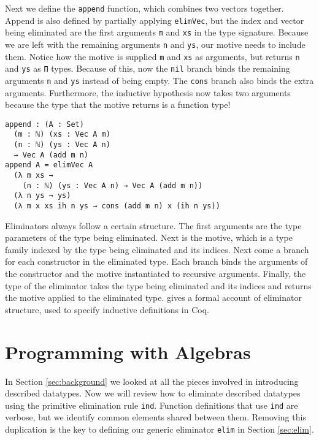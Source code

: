 \documentclass[preprint,nonatbib]{sigplanconf}
\begin{document}
Next we define the {\tt append} function, which combines two vectors
together. Append is also defined by partially applying
{\tt elimVec}, but the index and vector being eliminated are
the first arguments {\tt m} and {\tt xs} in the type signature.
Because we are left with the remaining arguments {\tt n} and 
{\tt ys}, our motive needs to include them. Notice how the motive is
supplied {\tt m} and {\tt xs} as arguments, but returns {\tt n} and
{\tt ys} as {\tt Π} types. Because of this, now the {\tt nil} branch
binds the remaining arguments {\tt n} and {\tt ys} instead of being
empty. The {\tt cons} branch also binds the extra arguments.
Furthermore, the inductive hypothesis now takes two arguments because
the type that the motive returns is a function type!

\begin{verbatim}
append : (A : Set)
  (m : ℕ) (xs : Vec A m)
  (n : ℕ) (ys : Vec A n)
  → Vec A (add m n)
append A = elimVec A
  (λ m xs →
    (n : ℕ) (ys : Vec A n) → Vec A (add m n))
  (λ n ys → ys)
  (λ m x xs ih n ys → cons (add m n) x (ih n ys))
\end{verbatim}

Eliminators always follow a certain structure. The first arguments are
the type parameters of the type being eliminated. Next is the motive,
which is a type family indexed by the type being eliminated and its
indices. Next come a branch for each constructor in the eliminated
type. Each branch binds the arguments of the constructor and the
motive instantiated to recursive arguments. Finally, the type of the
eliminator takes the type being eliminated and its indices and returns
the motive applied to the eliminated type. \citet{paulin1993inductive}
gives a formal account of eliminator structure, used to specify
inductive definitions in {\sc Coq}.

\section{Programming with Algebras}
\label{sec:ind}

In Section \ref{sec:background} we looked at all the pieces involved
in introducing described datatypes. Now we will review how to
eliminate described datatypes using the primitive elimination
rule {\tt ind}. Function definitions that use {\tt ind} are verbose,
but we identify common elements shared between them. Removing
this duplication is the key to defining our generic eliminator
{\tt elim} in Section \ref{sec:elim}.
\end{document}
